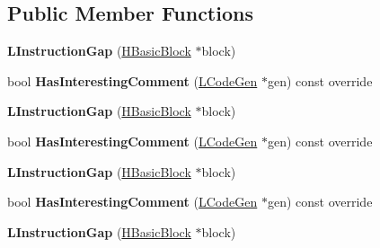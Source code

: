 \subsection*{Public Member Functions}
\begin{DoxyCompactItemize}
\item 
{\bfseries L\+Instruction\+Gap} (\hyperlink{classv8_1_1internal_1_1_h_basic_block}{H\+Basic\+Block} $\ast$block)\hypertarget{classv8_1_1internal_1_1_l_instruction_gap_a63492d0f9e8ce8b754bb1b3a10718391}{}\label{classv8_1_1internal_1_1_l_instruction_gap_a63492d0f9e8ce8b754bb1b3a10718391}

\item 
bool {\bfseries Has\+Interesting\+Comment} (\hyperlink{classv8_1_1internal_1_1_l_code_gen}{L\+Code\+Gen} $\ast$gen) const  override\hypertarget{classv8_1_1internal_1_1_l_instruction_gap_a688fc9f317d9909675c81dbd42462bba}{}\label{classv8_1_1internal_1_1_l_instruction_gap_a688fc9f317d9909675c81dbd42462bba}

\item 
{\bfseries L\+Instruction\+Gap} (\hyperlink{classv8_1_1internal_1_1_h_basic_block}{H\+Basic\+Block} $\ast$block)\hypertarget{classv8_1_1internal_1_1_l_instruction_gap_a63492d0f9e8ce8b754bb1b3a10718391}{}\label{classv8_1_1internal_1_1_l_instruction_gap_a63492d0f9e8ce8b754bb1b3a10718391}

\item 
bool {\bfseries Has\+Interesting\+Comment} (\hyperlink{classv8_1_1internal_1_1_l_code_gen}{L\+Code\+Gen} $\ast$gen) const  override\hypertarget{classv8_1_1internal_1_1_l_instruction_gap_a688fc9f317d9909675c81dbd42462bba}{}\label{classv8_1_1internal_1_1_l_instruction_gap_a688fc9f317d9909675c81dbd42462bba}

\item 
{\bfseries L\+Instruction\+Gap} (\hyperlink{classv8_1_1internal_1_1_h_basic_block}{H\+Basic\+Block} $\ast$block)\hypertarget{classv8_1_1internal_1_1_l_instruction_gap_a63492d0f9e8ce8b754bb1b3a10718391}{}\label{classv8_1_1internal_1_1_l_instruction_gap_a63492d0f9e8ce8b754bb1b3a10718391}

\item 
bool {\bfseries Has\+Interesting\+Comment} (\hyperlink{classv8_1_1internal_1_1_l_code_gen}{L\+Code\+Gen} $\ast$gen) const  override\hypertarget{classv8_1_1internal_1_1_l_instruction_gap_a688fc9f317d9909675c81dbd42462bba}{}\label{classv8_1_1internal_1_1_l_instruction_gap_a688fc9f317d9909675c81dbd42462bba}

\item 
{\bfseries L\+Instruction\+Gap} (\hyperlink{classv8_1_1internal_1_1_h_basic_block}{H\+Basic\+Block} $\ast$block)\hypertarget{classv8_1_1internal_1_1_l_instruction_gap_a63492d0f9e8ce8b754bb1b3a10718391}{}\label{classv8_1_1internal_1_1_l_instruction_gap_a63492d0f9e8ce8b754bb1b3a10718391}


\end{DoxyCompactItemize}

